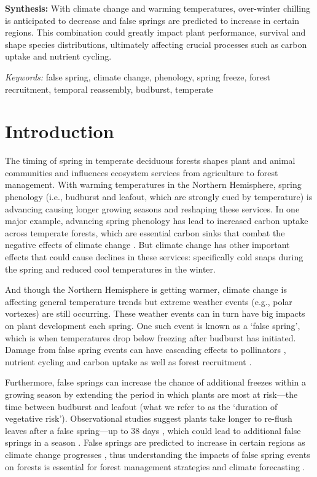 \documentclass{article}\usepackage[]{graphicx}\usepackage[]{color}
\begin{document}
\textbf{Synthesis:} With climate change and warming temperatures, over-winter chilling is anticipated to decrease and false springs are predicted to increase in certain regions. This combination could greatly impact plant performance, survival and shape species distributions, ultimately affecting crucial processes such as carbon uptake and nutrient cycling.

\vspace{2ex}
\textit{Keywords:} false spring, climate change, phenology, spring freeze, forest recruitment, temporal reassembly, budburst, temperate

\section*{Introduction}
The timing of spring in temperate deciduous forests shapes plant and animal communities and influences ecosystem services from agriculture to forest management. With warming temperatures in the Northern Hemisphere, spring phenology (i.e., budburst and leafout, which  are strongly cued by temperature) is advancing causing longer growing seasons \citep{Chuine2001} and reshaping these services. In one major example, advancing spring phenology has lead to increased carbon uptake across temperate forests, which are essential carbon sinks that combat the negative effects of climate change \citep{Keenan2014}. But climate change has other important effects that could cause declines in these services: specifically cold snaps during the spring and reduced cool temperatures in the winter.
  
And though the Northern Hemisphere is getting warmer, climate change is affecting general temperature trends but extreme weather events (e.g., polar vortexes) are still occurring. These weather events can in turn have big impacts on plant development each spring. One such event is known as a `false spring', which is when temperatures drop below freezing \citep[][i.e., below -2.2$^{\circ}$C]{Schwartz2002} after budburst has initiated. Damage from false spring events can have cascading effects to pollinators \citep{Boggs2012, Pardee2017}, nutrient cycling and carbon uptake as well as forest recruitment \citep{Hufkens2012, Klosterman2018, Richardson2013}.

Furthermore, false springs can increase the chance of additional freezes within a growing season by extending the period in which plants are most at risk---the time between budburst and leafout (what we refer to as the `duration of vegetative risk'). Observational studies suggest plants take longer to re-flush leaves after a false spring---up to 38 days \citep{Augspurger2009, Augspurger2013, Gu2008, Menzel2015}, which could lead to additional false springs in a season \citep{Augspurger2009}. False springs are predicted to increase in certain regions as climate change progresses \citep{Ault2015, Liu2018, Zohner2020}, thus understanding the impacts of false spring events on forests is essential for forest management strategies and climate forecasting \citep{OBrien2019}.
  
\end{document}
